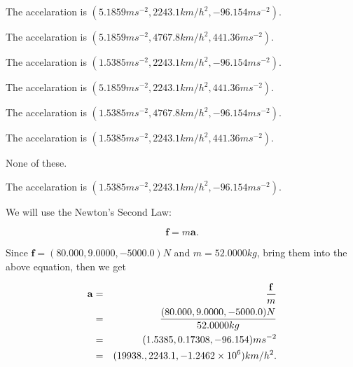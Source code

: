 \documentclass[12pt]{article}
\begin{document}
 
 
The accelaration is
$(
5.1859ms^{-2},
2243.1km/h^2,
-96.154ms^{-2}
).
$
 
 
The accelaration is
$(
5.1859ms^{-2},
4767.8km/h^2,
441.36ms^{-2}
).
$
 
 
The accelaration is
$(
1.5385ms^{-2},
2243.1km/h^2,
-96.154ms^{-2}
).
$
 
 
The accelaration is
$(
5.1859ms^{-2},
2243.1km/h^2,
441.36ms^{-2}
).
$
 
 
The accelaration is
$(
1.5385ms^{-2},
4767.8km/h^2,
-96.154ms^{-2}
).
$
 
 
The accelaration is
$(
1.5385ms^{-2},
2243.1km/h^2,
441.36ms^{-2}
).
$
 
 
 None of these.
 
 
\noindent{}
 
 
The accelaration is
$(
1.5385ms^{-2},
2243.1km/h^2,
-96.154ms^{-2}
).
$
 
 
\noindent{}
 
 
 
 
 
 
\noindent{}
 
 

We will use the Newton's Second Law:
 
\[
\mathbf{f}=m\mathbf{a}.
\]
 
Since $\mathbf{f}=( %
80.000,  %
9.0000,  %
-5000.0 )N$
and $m= %
52.0000kg$, bring them into the above equation, then we get
 
\begin{eqnarray*}
\mathbf{a}&=&\frac{\mathbf{f}}m  \\
&=&\frac{(
80.000 ,
9.0000 ,
-5000.0 )N
}{ %
52.0000 kg}  \\
&=&(
1.5385 ,
0.17308,
-96.154
)ms^{-2} \\
&=&(
19938. ,
2243.1 ,
-1.2462 \times 10^{6}
)km/h^2.
\end{eqnarray*}
 
 
 
\noindent{}
 
\end{document}
